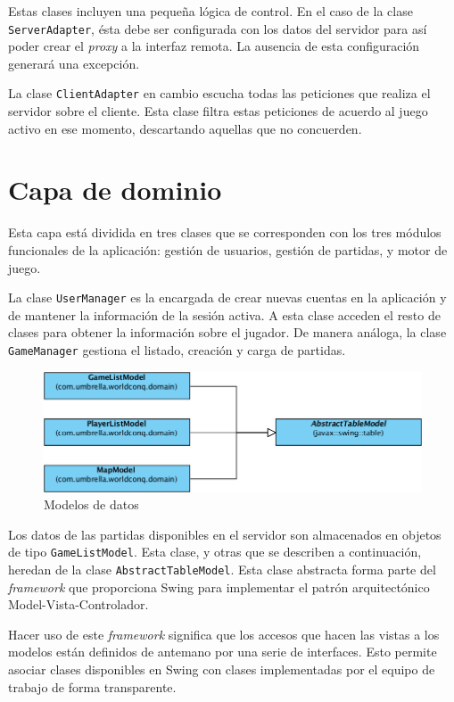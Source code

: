 Estas clases incluyen una pequeña lógica de control. En el caso de la clase
\texttt{ServerAdapter}, ésta debe ser configurada con los datos del servidor
para así poder crear el \textit{proxy} a la interfaz remota. La ausencia de
esta configuración generará una excepción.

La clase \texttt{ClientAdapter} en cambio escucha todas las peticiones que
realiza el servidor sobre el cliente. Esta clase filtra estas peticiones de
acuerdo al juego activo en ese momento, descartando aquellas que no concuerden.

\section{Capa de dominio}

Esta capa está dividida en tres clases que se corresponden con los tres módulos
funcionales de la aplicación: gestión de usuarios, gestión de partidas, y motor
de juego.

La clase \texttt{UserManager} es la encargada de crear nuevas cuentas en la
aplicación y de mantener la información de la sesión activa. A esta clase
acceden el resto de clases para obtener la información sobre el jugador. De
manera análoga, la clase \texttt{GameManager} gestiona el listado, creación y
carga de partidas.

\begin{figure}[h]
\caption{Modelos de datos}
\centering
\includegraphics[scale=0.4]{img/ch02arch-models.png}
\end{figure}

Los datos de las partidas disponibles en el servidor son almacenados en objetos
de tipo \texttt{GameListModel}. Esta clase, y otras que se describen a
continuación, heredan de la clase \texttt{AbstractTableModel}. Esta clase
abstracta forma parte del \textit{framework} que proporciona Swing para
implementar el patrón arquitectónico Model-Vista-Controlador.

Hacer uso de este \textit{framework} significa que los accesos que hacen las
vistas a los modelos están definidos de antemano por una serie de interfaces.
Esto permite asociar clases disponibles en Swing con clases implementadas por el
equipo de trabajo de forma transparente.

